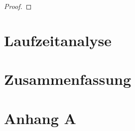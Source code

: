 \documentclass[12pt,oneside]{article}
\theoremstyle{remark}
\theoremstyle{definition}
\begin{document}
\begin{proof}
    
\end{proof}

\section{Laufzeitanalyse}

\section{Zusammenfassung}


\clearpage
\lhead{}
\printbibliography
{}


\clearpage
\appendix
\section{Anhang A}


\end{document}
